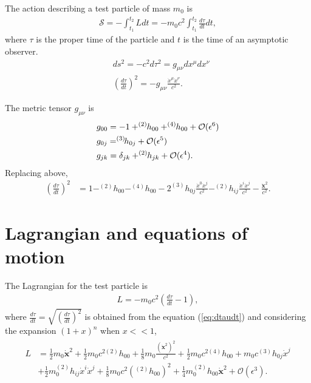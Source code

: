 The action describing a test particle of mass $m_0$ \cite{GravityPoisson} is 
\begin{align*}
\mathcal{S} = -\int_{t_1}^{t_2}Ldt  = -m_0c^2\int_{t_1}^{t_2}\frac{d\tau}{dt}dt,
\end{align*}
where $\tau$ is the proper time of the particle and $t$ is the time of an asymptotic observer.
\begin{align*}
&ds^2=-c^2d\tau^2 = g_{\mu\nu}dx^\mu dx^\nu\\
&\left(\frac{d\tau}{dt}\right)^2 = -g_{\mu\nu}\frac{\dot{x}^\mu\dot{x}^\nu}{c^2}.
\end{align*}

The metric tensor $g_{\mu\nu}$ is
\begin{subequations}
\label{eq:metricgeneral}
\begin{align}
		&g_{00} = -1+ ^{(2)}\hspace{-0.1cm}h_{00}+ ^{(4)}\hspace{-0.1cm}h_{00}+\mathcal{O}(\epsilon^6)\\
		&g_{0j} = \hspace{-0.1cm}^{(3)}\hspace{-0.05cm}h_{0j}+ \mathcal{O}(\epsilon^5) \\
		&g_{jk} = \delta_{jk}+^{(2)}\hspace{-0.1cm}h_{jk}+\mathcal{O}(\epsilon^4).
\end{align}
\end{subequations}
Replacing above,
\begin{align}
\label{eq:dtaudt}
\left(\frac{d\tau}{dt}\right)^2&=1-^{(2)}h_{00}-^{(4)}h_{00}-2^{(3)}h_{0j}\frac{\dot{x}^{0}\dot{x}^{j}}{c^2}-^{(2)}h_{ij}\frac{\dot{x}^{i}\dot{x}^{j}}{c^2}-\frac{\dot{\mathbf{x}}^2}{c^2}.
\end{align}

\section{Lagrangian and equations of motion}
The Lagrangian for the test particle is
\begin{align*}
L = -m_0c^2\left(\frac{d\tau}{dt}-1\right),
\end{align*}
where $\frac{d\tau}{dt} = \sqrt{\left(\frac{d\tau}{dt}\right)^2}$ is obtained from the equation (\ref{eq:dtaudt}) and considering the expansion $(1+x)^n$ when $x << 1$,
\begin{align}
\label{eq:firstlagrangian}
\begin{split}
L &= \frac{1}{2} m_0 \dot{\mathbf{x}}^2 + \frac{1}{2}m_0c^{2(2)}h_{00} + \frac{1}{8} m_0 \frac{(\dot{\mathbf{x}}^{2})^2}{c^2}  + \frac{1}{2} m_0c^{2(4)}h_{00} + m_0 c^{(3)}h_{0j} \dot{x}^j \\
&+ \frac{1}{2} m_0 ^{(2)}h_{ij}\dot{x}^{i} \dot{x}^{j} + \frac{1}{8} m_0 c^{2}\left(^{(2)}h_{00} \right)^{2} + \frac{1}{4} m_0^{(2)}h_{00} \dot{\mathbf{x}}^2 + \mathcal{O}(\epsilon^3).
\end{split} 
\end{align}


